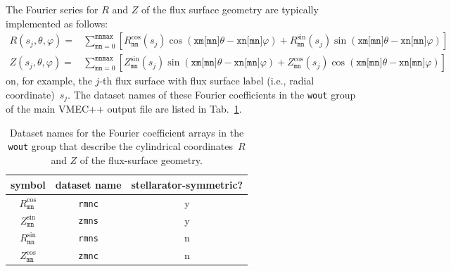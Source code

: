 The Fourier series for $R$ and $Z$ of the flux surface geometry
are typically implemented as follows:
\begin{align}
 R(s_j, \theta, \varphi) =& \sum_{\texttt{mn} = 0}^{\texttt{mnmax}}
   \left[   R_\texttt{mn}^\mathrm{cos}(s_j) \cos(\texttt{xm[mn]} \theta - \texttt{xn[mn]} \varphi)
          + R_\texttt{mn}^\mathrm{sin}(s_j) \sin(\texttt{xm[mn]} \theta - \texttt{xn[mn]} \varphi) \right] \\
 Z(s_j, \theta, \varphi) =& \sum_{\texttt{mn} = 0}^{\texttt{mnmax}}
   \left[   Z_\texttt{mn}^\mathrm{sin}(s_j) \sin(\texttt{xm[mn]} \theta - \texttt{xn[mn]} \varphi)
          + Z_\texttt{mn}^\mathrm{cos}(s_j) \cos(\texttt{xm[mn]} \theta - \texttt{xn[mn]} \varphi) \right]
\end{align}
on, for example, the $j$-th flux surface with flux surface label (i.e., radial coordinate)~$s_j$.
%
The dataset names of these Fourier coefficients in the \texttt{wout} group
of the main VMEC++ output file are listed in Tab.~\ref{tab:fc_rz}.
\begin{table}[h]
 \centering
 \begin{tabular}{|c|c|c|}
  \hline
  symbol & dataset name & stellarator-symmetric? \\
  \hline
  $R_\texttt{mn}^\mathrm{cos}$ & \texttt{rmnc} & y \\
  $Z_\texttt{mn}^\mathrm{sin}$ & \texttt{zmns} & y \\
  \hline
  $R_\texttt{mn}^\mathrm{sin}$ & \texttt{rmns} & n \\
  $Z_\texttt{mn}^\mathrm{cos}$ & \texttt{zmnc} & n \\
  \hline
 \end{tabular}
 \caption{Dataset names for the Fourier coefficient arrays in the \texttt{wout} group
          that describe the cylindrical coordinates~$R$ and $Z$ of the flux-surface geometry.}
 \label{tab:fc_rz}
\end{table}

